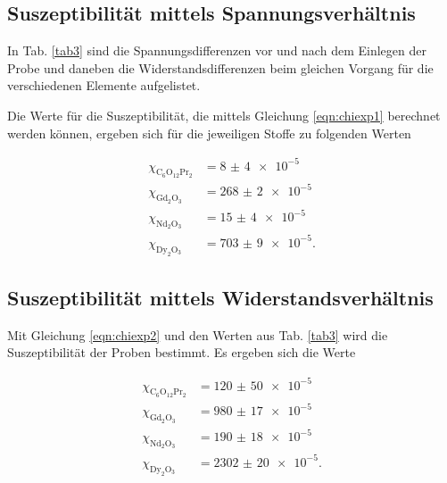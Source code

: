 \subsection{Suszeptibilität mittels Spannungsverhältnis}
In Tab. \ref{tab3} sind die Spannungsdifferenzen vor und nach dem Einlegen der Probe und daneben die Widerstandsdifferenzen beim gleichen Vorgang für die verschiedenen Elemente aufgelistet.


\noindent Die Werte für die Suszeptibilität, die mittels Gleichung \eqref{eqn:chiexp1} berechnet werden können, ergeben sich für die jeweiligen Stoffe 
zu folgenden Werten 

\begin{align*} 
   \chi_{\text{C}_6 \text{O}_{12} \text{Pr}_2} &= \num{8(4)e-5}\\ %
   \chi_{\text{Gd}_2 \text{O}_3} &= \num{268(2)e-5}\\
   \chi_{\text{Nd}_2 \text{O}_3} &= \num{15(4)e-5}\\
   \chi_{\text{Dy}_2 \text{O}_3} &= \num{703(9)e-5}.
\end{align*}


\subsection{Suszeptibilität mittels Widerstandsverhältnis}
Mit Gleichung \eqref{eqn:chiexp2} und den Werten aus Tab. \ref{tab3}
wird die Suszeptibilität der Proben bestimmt.
Es ergeben sich die Werte

\begin{align*} 
   \chi_{\text{C}_6 \text{O}_{12} \text{Pr}_2} &= \num{120(50)e-5}\\
   \chi_{\text{Gd}_2 \text{O}_3} &= \num{980(17)e-5}\\
   \chi_{\text{Nd}_2 \text{O}_3} &= \num{190(18)e-5}\\
   \chi_{\text{Dy}_2 \text{O}_3} &= \num{2302(20)e-5}.
\end{align*}
